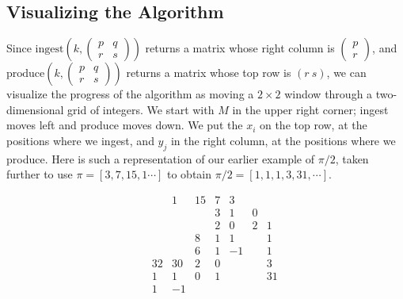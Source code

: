 \documentclass[11pt, oneside]{amsart}   	%
\newcommand{\pqrs}{\left(
\begin{smallmatrix} 
p & q\\ 
r & s 
\end{smallmatrix}
\right)}
\begin{document}
\subsection{Visualizing the Algorithm}
Since $\mbox{ingest}(k,\pqrs)$ returns a matrix whose right column is
$\left( \begin{smallmatrix} p \\  r \end{smallmatrix}\right)$,
and $\mbox{produce}(k,\pqrs)$ returns a matrix whose top row is $(r\ s)$, we can visualize the progress of the algorithm
as moving a $2 \times 2$ window through a two-dimensional grid of integers.
We start with $M$ in the upper right corner; ingest moves left and produce moves down.
We put the $x_i$ on the top row, at the positions where we ingest, and $y_j$ in the right column, at the positions where we produce.
Here is such a representation of our earlier example of $\pi/2$, taken further to use $\pi = [3,7,15, 1\cdots]$ to obtain $\pi/2 = [1,1,1,3,31,\cdots]$.

\begin{equation*}\label{eq:2dgrid}
\begin{matrix}
 & & & 1& 15&       7&  3& &\\
 & & &  &        &     3&   1& 0&\\
 & & &  &        &     2&    0& 2& 1\\
 & & &  &        8&   1&    1&   &  1\\
 & & &  &        6&   1&    -1&  & 1\\
 & & 32& 30&  2& 0&        &  &  3\\
 & &  1&   1&  0&  1&        &  & 31\\
 & &   1&  -1&   &    &        &  &
\end{matrix}
\end{equation*}
\end{document}
